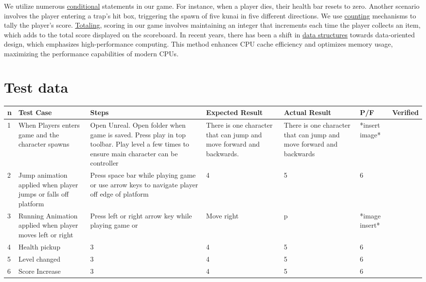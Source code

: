 \documentclass{article}
\begin{document}
We utilize numerous \underline{conditional} statements in our game. For instance, when a player dies, their health bar resets to zero. Another scenario involves the player entering a trap's hit box, triggering the spawn of five kunai in five different directions. We use \underline{counting} mechanisms to tally the player's score. \underline{Totaling}, scoring in our game involves maintaining an integer that increments each time the player collects an item, which adds to the total score displayed on the scoreboard. In recent years, there has been a shift in \underline{data structures} towards data-oriented design, which emphasizes high-performance computing. This method enhances CPU cache efficiency and optimizes memory usage, maximizing the performance capabilities of modern CPUs.

\section{Test data}
\begin{center}
	\begin{tabular}{|m{1em}|m{1em}|m{1em}|m{1em}|m{1em}|m{1em}|m{1em}|}
	\hline
		n & Test Case & Steps & Expected Result & Actual Result & P/F & Verified  \\
	\hline
		1 & When Players enters game and the character spawns & Open Unreal. Open folder when game is saved. Press play in top toolbar. Play level a few times to ensure main character can be controller & There is one character that can jump and move forward and backwards. & There is one character that can jump and move forward and backwards & *insert image* \\
	\hline
		2 & Jump animation applied when player jumps or falls off platform & Press space bar while playing game or use arrow keys to navigate player off edge of platform & 4 & 5 & 6 \\
	\hline
		3 & Running Animation applied when player moves left or right & Press left or right arrow key while playing game or & Move right & p & *image insert* \\
	\hline
		4 & Health pickup  & 3 & 4 & 5 & 6 \\
	\hline
		5 & Level changed & 3 & 4 & 5 & 6 \\
	\hline
		6 & Score Increase & 3 & 4 & 5 & 6 \\
	\hline
\end{tabular}
\end{center}
\end{document}
